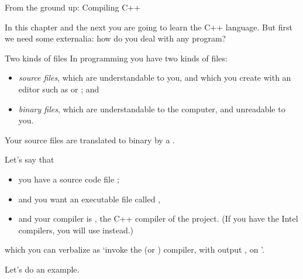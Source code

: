 
 {From the ground up: Compiling C++}

In this chapter and the next you are going to learn the C++
language. But first we need some externalia: how do you deal with any
program?

\begin{block}{Two kinds of files}
  \label{sl:sourcebinary}
  In programming you have two kinds of files:
  \begin{itemize}
  \item \emph{source files}, which are understandable
    to you, and which you create with an editor such as  or
    ; and
  \item \emph{binary files}, which are understandable
    to the computer, and unreadable to you.
  \end{itemize}
  Your source files are translated to binary by a
  .
\end{block}

Let's say that
\begin{itemize}
\item you have a source code file ;
\item and you want an executable file called ,
\item and your compiler is , the C++ compiler of the
   project. (If you have the Intel compilers, you will
  use  instead.)
\end{itemize}

which you can verbalize as `invoke the  (or ) compiler,
with output , on '.

Let's do an example.

